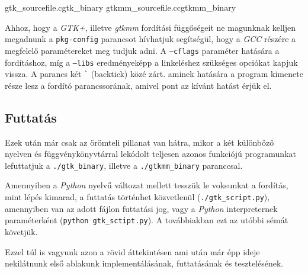 \lstcompiles
{gtk\_sourcefile.c}{gtk\_binary}
{gtkmm\_sourcefile.cc}{gtkmm\_binary}

Ahhoz, hogy a \textit{GTK+}, illetve \textit{gtkmm} fordítási függőségeit ne magunknak kelljen megadnunk a \texttt{pkg-config} parancsot hívhatjuk segítségül, hogy a \textit{GCC} részére a megfelelő paramétereket meg tudjuk adni. A \texttt{--cflags} paraméter hatására a fordításhoz, míg a \texttt{--libs} eredményeképp a linkeléshez szükséges opciókat kapjuk vissza. A parancs két \texttt{\`} (backtick) közé zárt. aminek hatására a program kimenete része lesz a fordító parancssorának, amivel pont az kívánt hatást érjük el.

\subsection{Futtatás}

Ezek után már csak az örömteli pillanat van hátra, mikor a két különböző nyelven és függvénykönyvtárral lekódolt teljesen azonos funkciójú programunkat lefuttatjuk a \texttt{./gtk\_binary}, illetve a \texttt{./gtkmm\_binary} paranccsal.

Amennyiben a \textit{Python} nyelvű változat mellett tesszük le voksunkat a fordítás, mint lépés kimarad, a futtatás történhet közvetlenül (\texttt{./gtk\_script.py}), amennyiben van az adott fájlon futtatási jog, vagy a \textit{Python} interpreternek paraméterként (\texttt{python gtk\_sctipt.py}). A továbbiakban ezt az utóbbi sémát követjük.

Ezzel túl is vagyunk azon a rövid áttekintésen ami után már épp ideje nekilátnunk első ablakunk implementálásának, futtatásának és tesztelésének.

